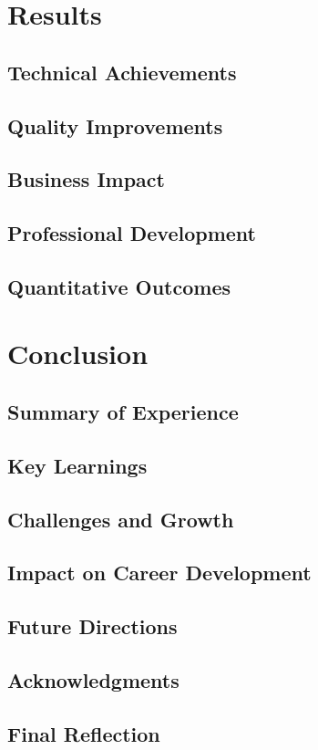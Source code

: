 \documentclass[a4paper, 11pt, oneside]{report}
\begin{document}
\chapter{Results}
\section{Technical Achievements}
\section{Quality Improvements}
\section{Business Impact}
\section{Professional Development}
\section{Quantitative Outcomes}


\chapter{Conclusion}
\section{Summary of Experience}
\section{Key Learnings}
\section{Challenges and Growth}
\section{Impact on Career Development}
\section{Future Directions}
\section{Acknowledgments}
\section{Final Reflection}

\end{document}
